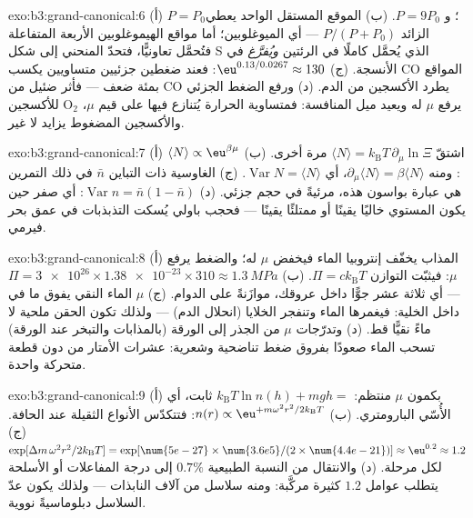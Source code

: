 \begin{solution}{exo:b3:grand-canonical:6}
(أ) $P = P_0$؛ و $P = 9P_0$. (ب) الموقع المستقل الواحد يعطي
الزائد $P/(P + P_0)$ --- أي الميوغلوبين؛ أما مواقع الهيموغلوبين الأربعة
المتفاعلة فتُحمَّل تعاونيًّا، فتحدّ المنحني إلى
شكل S الذي يُحمَّل كاملًا في الرئتين \emph{ويُفرَّغ} في
الأنسجة. (ج) $\eu^{0.13/0.0267} \approx 130$: فعند ضغطين جزئيين
متساويين يكسب CO المواقع بمئة ضعف --- فأثر ضئيل من CO
يطرد الأكسجين من الدم. (د) ورفع الضغط الجزئي للأكسجين O$_2$
يرفع $\mu$ له ويعيد ميل المنافسة: فمتساوية
الحرارة يُتنازع فيها على قيم $\mu$، والأكسجين المضغوط يزايد
لا غير.
\end{solution}

\begin{solution}{exo:b3:grand-canonical:7}
(أ) اشتقّ $\langle N\rangle = k_{\text{B}}T\,\partial_\mu
\ln\Xi$ مرة أخرى. (ب) $\langle N\rangle \propto
\eu^{\beta\mu}$: ومنه $\partial_\mu\langle N\rangle = \beta\langle
N\rangle$، أي $\operatorname{Var}N = \langle N\rangle$. (ج)
الغاوسية ذات التباين $\bar n$ في ذلك التمرين هي عبارة بواسون
هذه، مرئيةً في حجم جزئي. (د) $\operatorname{Var}n =
\bar n(1 - \bar n)$: أي صفر حين يكون المستوي خاليًا يقينًا أو
ممتلئًا يقينًا --- فحجب باولي يُسكت التذبذبات في عمق بحر فيرمي.
\end{solution}

\begin{solution}{exo:b3:grand-canonical:8}
(أ) المذاب يخفّف إنتروبيا الماء فيخفض $\mu$ له؛ والضغط
يرفع $\mu$: فيثبّت التوازن $\Pi = ck_{\text{B}}T$. (ب) $\Pi =
\num{3e26} \times \num{1.38e-23} \times 310 \approx
\qty{1.3}{MPa}$ --- أي ثلاثة عشر جوًّا داخل عروقك،
موازَنةً على الدوام. (ج) $\mu$ الماء النقي يفوق ما في
داخل الخلية: فيغمرها الماء وتنفجر الخلايا (انحلال الدم) ---
ولذلك تكون الحقن ملحية لا ماءً نقيًّا قط. (د) وتدرّجات $\mu$
من الجذر إلى الورقة (بالمذابات والتبخر عند الورقة) تسحب الماء صعودًا
بفروق ضغط تناضحية وشعرية: عشرات الأمتار
من دون قطعة متحركة واحدة.
\end{solution}

\begin{solution}{exo:b3:grand-canonical:9}
(أ) بكمون $\mu$ منتظم: $k_{\text{B}}T\ln n(h) + mgh = $ ثابت، أي
الأُسّي البارومتري. (ب) $n(r) \propto
\eu^{+m\omega^2r^2/2k_{\text{B}}T}$: فتتكدّس الأنواع الثقيلة عند
الحافة. (ج) $\exp[\Delta m\,\omega^2r^2/2k_{\text{B}}T] =
\exp[\num{5e-27} \times \num{3.6e5}/(2 \times \num{4.4e-21})]
\approx \eu^{0.2} \approx 1.2$ لكل مرحلة. (د) والانتقال من النسبة
الطبيعية $0.7\%$ إلى درجة المفاعلات أو الأسلحة يتطلب
عوامل $1.2$ كثيرة مركَّبة: ومنه سلاسل من آلاف
النابذات --- ولذلك يكون عدّ السلاسل دبلوماسيةً نووية.
\end{solution}

